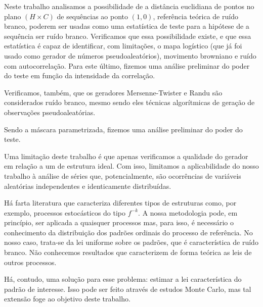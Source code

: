 
Neste trabalho analisamos a possibilidade de a distância euclidiana de pontos no plano $(H\times C)$ de sequências ao ponto $(1,0)$, referência teórica de ruído branco, poderem ser usadas como uma estatística de teste para a hipótese de a sequência ser ruído branco.
Verificamos que essa possibilidade existe, e que essa estatística é capaz de identificar, com limitações, o mapa logístico (que já foi usado como gerador de números pseudoaleatórios), movimento browniano e ruído com autocorrelação.
Para este último, fizemos uma análise preliminar do poder do teste em função da intensidade da correlação.

Verificamos, também, que os geradores Mersenne-Twister e Randu são considerados ruído branco, mesmo sendo eles técnicas algorítmicas de geração de observações pseudoaleatórias.

Sendo a máscara parametrizada, fizemos uma análise preliminar do poder do teste.

Uma limitação deste trabalho é que apenas verificamos a qualidade do gerador em relação a um de estrutura ideal.
Com isso, limitamos a aplicabilidade do nosso trabalho à análise de séries que, potencialmente, são ocorrências de variáveis aleatórias independentes e identicamente distribuídas.

Há farta literatura que caracteriza diferentes tipos de estruturas como, por exemplo, processos estocásticos do tipo $f^{-k}$.
A nossa metodologia pode, em princípio, ser aplicada a quaisquer processos mas, para isso, é necessário o conhecimento da distribuição dos padrões ordinais do processo de referência.
No nosso caso, trata-se da lei uniforme sobre os padrões, que é característica de ruído branco.
Não conhecemos resultados que caracterizem de forma teórica as leis de outros processos.

Há, contudo, uma solução para esse problema: estimar a lei característica do padrão de interesse.
Isso pode ser feito através de estudos Monte Carlo, mas tal extensão foge ao objetivo deste trabalho.

